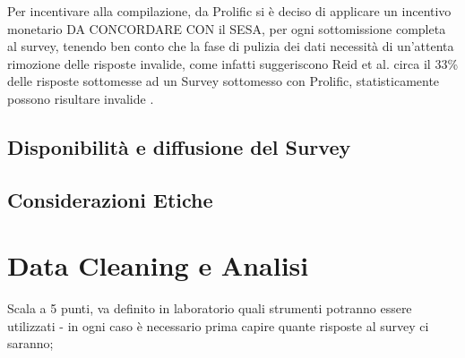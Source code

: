    Per incentivare alla compilazione, da Prolific si è deciso di applicare un incentivo monetario DA CONCORDARE CON il SESA, per ogni sottomissione completa al survey, tenendo ben conto che la fase di pulizia dei dati necessità di un'attenta rimozione delle risposte invalide, come infatti suggeriscono Reid et al. circa il 33\% delle risposte sottomesse ad un Survey sottomesso con Prolific, statisticamente possono risultare invalide \cite{reid2022software}. 
    \subsection{Disponibilità e diffusione del Survey}
    \subsection{Considerazioni Etiche}
    
    \section{Data Cleaning e Analisi}
      
    Scala a 5 punti, va definito in laboratorio quali strumenti potranno essere utilizzati - in ogni caso è necessario prima capire quante risposte al survey ci saranno;
\newpage
